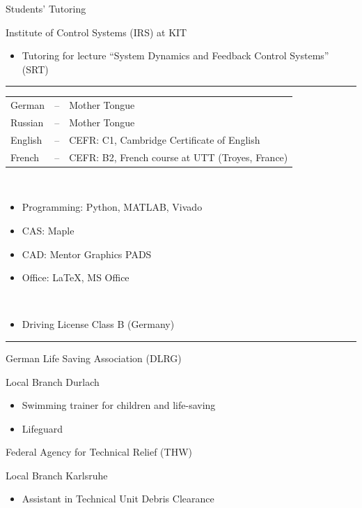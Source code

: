 \documentclass[a4paper,10pt]{article}
\newlength{\cvcolumngapwidth}
\newlength{\cvleftcolumnwidth}
\newlength{\cvrightcolumnwidth}
\newcommand{\cvsectionstyle}[1]{{\normalsize\textcolor{cvsectioncolor}{#1}}}
\newcommand{\cvtitlestyle}[1]{{\large\textcolor{cvtitlecolor}{#1}}}
\newcommand{\cvdurationstyle}[1]{{\small\textcolor{cvdurationcolor}{#1}}}
\newcommand{\cvheadingstyle}[1]{{\normalsize\textcolor{cvheadingcolor}{#1}}}
\newlength{\cvafteritemskipamount}
\newlength{\cvaftersectionskipamount}
\newlength{\cvbetweensectionandheadingextraskipamount}
\newlength{\cvaftertitleskipamount}
\newlength{\cvparskip}
\newcommand{\cvsection}[1]{
    \begin{minipage}[t][][b]{\cvleftcolumnwidth}
        \raggedleft\cvsectionstyle{#1}
    \end{minipage}%
    \hspace{\cvcolumngapwidth}%
    \begin{minipage}[t]{\cvrightcolumnwidth}
        \textcolor{cvrulecolor}{\rule{\cvrightcolumnwidth}{0.3mm}}
    \end{minipage}

    \vspace{\cvaftersectionskipamount}
}
\newcommand{\cvitem}[2]{
    \begin{minipage}[t]{\cvleftcolumnwidth}
    \strut\vspace*{-\baselineskip}\newline %
    \raggedleft #1
    \end{minipage}%
    \hspace{\cvcolumngapwidth}%
    \begin{minipage}[t]{\cvrightcolumnwidth}
        \setlength{\parskip}{\cvparskip}
        \strut\vspace*{-\baselineskip}\newline #2 %
    \end{minipage}

    \vspace{\cvafteritemskipamount}
}
\newcommand{\cvtitle}[1]{
    \cvtitlestyle{#1}

    \vspace{\cvaftertitleskipamount}
    \vspace{-\cvparskip}
}
\begin{document}
\cvitem{\cvdurationstyle{April 2018 -- July 2018}}{\cvtitle{Students' Tutoring}
    Institute of Control Systems (IRS) at KIT
    \begin{itemize}[leftmargin=*]
        \item Tutoring for lecture ``System Dynamics and Feedback Control Systems'' (SRT)
    \end{itemize}
}
\cvsection{SKILLS}

\cvitem{\cvheadingstyle{Languages}}{
    \hspace*{-2mm}\begin{tabular}{lcl}
    German  & -- & Mother Tongue \\
    Russian & -- & Mother Tongue \\
    English & -- & CEFR: C1, Cambridge Certificate of English \\
    French & -- & CEFR: B2, French course at UTT (Troyes, France) \\
    \end{tabular}
}

\cvitem{\cvheadingstyle{Computer skills}}{
    \\[-5.5ex]\begin{itemize}[leftmargin=*]
    	\item Programming: Python, MATLAB, Vivado
    	\item CAS: Maple
    	\item CAD: Mentor Graphics PADS
    	\item Office: \LaTeX, MS Office
    \end{itemize}
}

\cvitem{\cvheadingstyle{Other}}{
	\\[-5.5ex]\begin{itemize}[leftmargin=*]
		\item Driving License Class B (Germany)

	\end{itemize}
}


\cvsection{VOLUNTEER EXPERIENCE}
\cvitem{\cvdurationstyle{}}{\cvtitle{German Life Saving Association (DLRG)}
	Local Branch Durlach
	\begin{itemize}[leftmargin=*]
		\item Swimming trainer for children and life-saving
		\item Lifeguard
	\end{itemize}
}
\cvitem{\cvdurationstyle{}}{\cvtitle{Federal Agency for Technical Relief (THW)}
	Local Branch Karlsruhe
	\begin{itemize}[leftmargin=*]
		\item Assistant in Technical Unit Debris Clearance
	\end{itemize}
}
\end{document}
